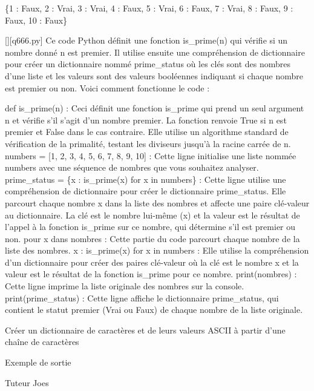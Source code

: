 \{1 : Faux, 2 : Vrai, 3 : Vrai, 4 : Faux, 5 : Vrai, 6 : Faux, 7 : Vrai, 8 : Faux, 9 : Faux, 10 : Faux\}
        \par
        \begin{solution}
            \renewcommand{\nomfichier}{q666.py}
            \pythonfile{\chemincode \nomfichier}[][\nomfichier]
            Ce code Python définit une fonction is\_prime(n) qui vérifie si un nombre donné n est premier. Il utilise ensuite une compréhension de dictionnaire pour créer un dictionnaire nommé prime\_status où les clés sont des nombres d'une liste et les valeurs sont des valeurs booléennes indiquant si chaque nombre est premier ou non. Voici comment fonctionne le code :

    def is\_prime(n) : Ceci définit une fonction is\_prime qui prend un seul argument n et vérifie s'il s'agit d'un nombre premier. La fonction renvoie True si n est premier et False dans le cas contraire. Elle utilise un algorithme standard de vérification de la primalité, testant les diviseurs jusqu'à la racine carrée de n.
    numbers = [1, 2, 3, 4, 5, 6, 7, 8, 9, 10] : Cette ligne initialise une liste nommée numbers avec une séquence de nombres que vous souhaitez analyser.
    prime\_status = \{x : is\_prime(x) for x in numbers\} : Cette ligne utilise une compréhension de dictionnaire pour créer le dictionnaire prime\_status. Elle parcourt chaque nombre x dans la liste des nombres et affecte une paire clé-valeur au dictionnaire. La clé est le nombre lui-même (x) et la valeur est le résultat de l'appel à la fonction is\_prime sur ce nombre, qui détermine s'il est premier ou non.
        pour x dans nombres : Cette partie du code parcourt chaque nombre de la liste des nombres.
        {x : is\_prime(x) for x in numbers} : Elle utilise la compréhension d'un dictionnaire pour créer des paires clé-valeur où la clé est le nombre x et la valeur est le résultat de la fonction is\_prime pour ce nombre.
    print(nombres) : Cette ligne imprime la liste originale des nombres sur la console.
    print(prime\_status) : Cette ligne affiche le dictionnaire prime\_status, qui contient le statut premier (Vrai ou Faux) de chaque nombre de la liste originale.
        \end{solution}
        

        \question
        Créer un dictionnaire de caractères et de leurs valeurs ASCII à partir d'une chaîne de caractères

Exemple de sortie

Tuteur Joes

